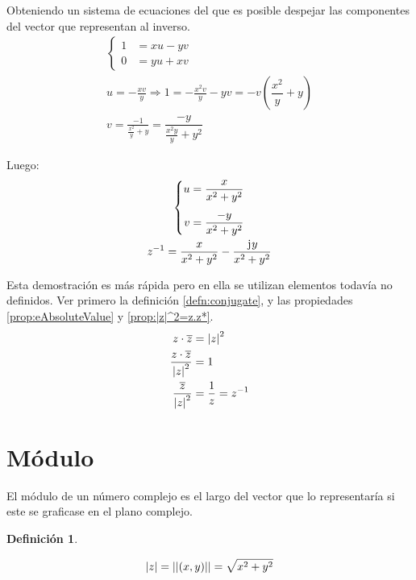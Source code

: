 \documentclass[a5paper,12pt,twoside]{book}
\newtheorem{defn}{{Definición}}[chapter]
\begin{document}
Obteniendo un sistema de ecuaciones del que es posible despejar las componentes del vector que representan al inverso.
\begin{gather*}
    \left\{
    \begin{aligned}
        1 &= xu-yv
        \\
        0 &= yu+xv
    \end{aligned}
    \right.
    \\
    u = -\frac{xv}{y} \Rightarrow 1= -\frac{x^2v}{y}-yv = -v\left( \dfrac{x^2}{y}+y \right)
    \\
    v=\frac{-1}{\frac{x^2}{y}+y}=\dfrac{-y}{\frac{x^2y}{y}+y^2}
\end{gather*}

Luego:
\begin{gather*}
    \left\{
    \begin{aligned}
        u &= \frac{x}{x^2+y^2}
        \\[1ex]
        v &= \frac{-y}{x^2+y^2}
    \end{aligned}
    \right.
    \\
    z^{-1} = \dfrac{x}{x^2+y^2}-\dfrac{\mkern2mu\mathrm{j}\mkern1mu y}{x^2+y^2}
\end{gather*}


Esta demostración es más rápida pero en ella se utilizan elementos todavía no definidos.
Ver primero la definición \ref{defn:conjugate}, y las propiedades \ref{prop:eAbsoluteValue} y \ref{prop:|z|^2=z.z*}.
\begin{align*}
    z \cdot \overline{z} &= {\left| {z} \right|}^2
    \\
    \frac{z \cdot \overline{z}}{{\left| {z} \right|}^2} &= 1
    \\
    \frac{\overline{z}}{{\left| {z} \right|}^2} &= \dfrac{1}{z}=z^{-1}
\end{align*}


\section{Módulo}

El módulo de un número complejo es el largo del vector que lo representaría si este se graficase en el plano complejo.

\begin{mdframed}[style=DefinitionFrame]
    \begin{defn}
    \end{defn}
    \begin{equation*}
        {\left| {z} \right|} = {\left|\left| {(x,y)} \right|\right|} = \sqrt{x^2+y^2}
    \end{equation*}
\end{mdframed}
\end{document}
